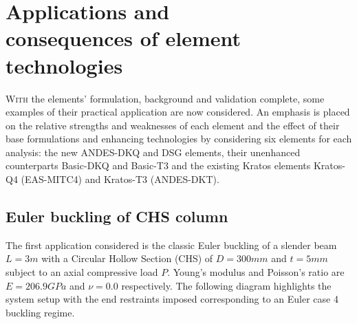 



\chapter[Applications and consequences of element technologies]{Applications and \\ consequences of element \\ technologies}
\label{chap:chapter_application}

\renewcommand{\Thema}{Applications and consequences of element technologies}

\lettrine[lines=2]{W}{ith} the elements' formulation, background and validation complete, some examples of their practical application are now considered. An emphasis is placed on the relative strengths and weaknesses of each element and the effect of their base formulations and enhancing technologies by considering six elements for each analysis: the new ANDES-DKQ and DSG elements, their unenhanced counterparts Basic-DKQ and Basic-T3 and the existing Kratos elements Kratos-Q4 (EAS-MITC4) and Kratos-T3 (ANDES-DKT).

\section{Euler buckling of CHS column}
\label{applications: Euler buckling of CHS column}
The first application considered is the classic Euler buckling of a slender beam $L=3m$ with a Circular Hollow Section (CHS) of $D = 300mm$ and $t = 5mm$ subject to an axial compressive load $P$. Young's modulus and Poisson's ratio are $E = 206.9GPa$ and $\nu = 0.0$ respectively. The following diagram highlights the system setup with the end restraints imposed corresponding to an Euler case 4 buckling regime. 

